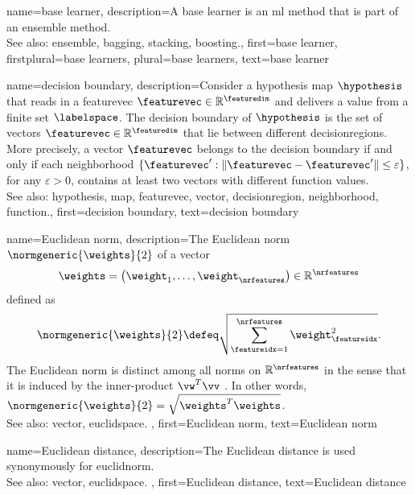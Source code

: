 {name={base learner}, 
 description={A base learner is an \gls{ml} method 
              that is part of an \gls{ensemble} method. \\
		See also: \gls{ensemble}, \gls{bagging}, \gls{stacking}, \gls{boosting}.},
	first={base learner},
	firstplural={base learners},
	plural={base learners},
	text={base learner} 
}	


{name={decision boundary}, 
	description={Consider a 
		\gls{hypothesis} \gls{map} $\hypothesis$ that reads in a \gls{featurevec}  
		$\featurevec \in \mathbb{R}^{\featuredim}$ and delivers a value from a finite set $\labelspace$. 
		The decision boundary of $\hypothesis$ is the set of \glspl{vector} $\featurevec \in \mathbb{R}^{\featuredim}$ 
		that lie between different \glspl{decisionregion}. More precisely, a 
		\gls{vector} $\featurevec$ belongs to the decision boundary if and only 
		if each \gls{neighborhood} $\{ \featurevec': \| \featurevec - \featurevec' \| \leq \varepsilon \}$, 
		for any $\varepsilon >0$, contains at least two \glspl{vector} with different \gls{function} values.
				\\
		See also: \gls{hypothesis}, \gls{map}, \gls{featurevec}, \gls{vector}, \gls{decisionregion}, \gls{neighborhood}, \gls{function}.},
	first={decision boundary},
	text={decision boundary} 
}


{name={Euclidean norm}, 
	description={The 
		Euclidean norm $\normgeneric{\weights}{2}$ of a \gls{vector} 
		$$\weights = \big(\weight_{1},\ldots,\weight_{\nrfeatures} \big) \in
		\mathbb{R}^{\nrfeatures}$$
		defined as 
		$$\normgeneric{\weights}{2} \defeq \sqrt{\sum_{\featureidx=1}^{\nrfeatures}\weight^2_{\featureidx}}.$$ 
		The Euclidean norm is distinct among all norms on $\mathbb{R}^{\nrfeatures}$ in the sense 
		that it is induced by the inner-product $\vw^{T} \vv$ \cite{RudinBook,HalmosFiniteDimVecSpace,BoydConvexBook}. 
		In other words, $\normgeneric{\weights}{2}= \sqrt{\weights^{T} \weights}$.	\\
		See also: \gls{vector}, \gls{euclidspace}. },
	first={Euclidean norm},
	text={Euclidean norm} 
}

{name={Euclidean distance}, 
	description={The Euclidean distance is used 
	synonymously for \gls{euclidnorm}.	\\
	See also: \gls{vector}, \gls{euclidspace}. },
	first={Euclidean distance},
	text={Euclidean distance} 
}

